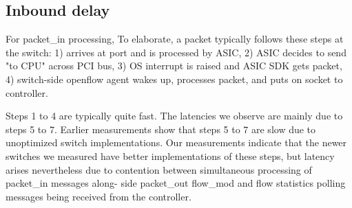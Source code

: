  
\iffalse
\subsection{Inbound delay}
For packet\_in processing, 
To elaborate, a packet typically follows these steps at the switch: 1)
arrives at port and is processed by ASIC, 2) ASIC decides to send "to
CPU" across PCI bus, 3) OS interrupt is raised and ASIC SDK gets
packet, 4) switch-side openflow agent wakes up, processes packet, and
puts on socket to controller.


Steps 1 to 4 are typically quite fast. The latencies we observe are mainly due to
steps 5 to 7. Earlier measurements show that steps 5 to 7 are slow due to
unoptimized switch implementations. Our measurements indicate that the newer
switches we measured have better implementations of these steps, but latency
arises nevertheless due to contention between simultaneous processing of
packet\_in messages along- side packet\_out flow\_mod and flow statistics
polling messages being received from the controller. 
 
